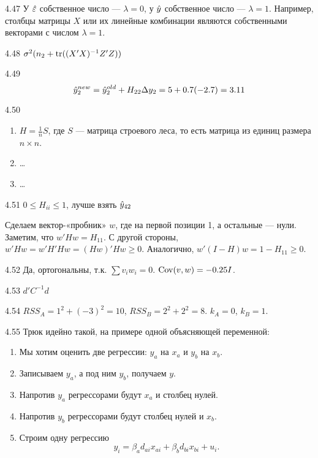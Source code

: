 \protect \hypertarget {soln:4.47}{}
\begin{solution}{{4.47}}
У $\hat{\varepsilon}$ собственное число — $\lambda=0$, у $\hat{y}$ собственное число — $\lambda=1$. Например, столбцы матрицы $X$ или их линейные комбинации являются собственными векторами с числом $\lambda=1$.
\end{solution}
\protect \hypertarget {soln:4.48}{}
\begin{solution}{{4.48}}
$\sigma^2( n_2  + \operatorname{tr}((X'X)^{-1}Z'Z))$
\end{solution}
\protect \hypertarget {soln:4.49}{}
\begin{solution}{{4.49}}
\[
\hat{y}_2^{new} = \hat{y}_2^{old} + H_{22} \Delta y_2 = 5 + 0.7(-2.7) = 3.11
\]
\end{solution}
\protect \hypertarget {soln:4.50}{}
\begin{solution}{{4.50}}
\begin{enumerate}
\item $H = \frac{1}{n} S$, где $S$ — матрица строевого леса, то есть матрица из единиц размера $n\times n$.
\item \ldots
\item \ldots
\end{enumerate}
\end{solution}
\protect \hypertarget {soln:4.51}{}
\begin{solution}{{4.51}}
$0 \leq H_{ii} \leq 1$,  лучше взять $\hat{y}_{42}$

Сделаем вектор-«пробник» $w$, где на первой позиции 1, а остальные — нули. Заметим, что $w'Hw=H_{11}$. С другой стороны, $w'Hw=w'H'Hw=(Hw)'Hw \geq 0$. Аналогично, $w'(I-H)w=1-H_{11}\geq 0$.
\end{solution}
\protect \hypertarget {soln:4.52}{}
\begin{solution}{{4.52}}
Да, ортогональны, т.к. $\sum v_i w_i = 0$. $\operatorname{Cov}(v,w)=-0.25 I$.
\end{solution}
\protect \hypertarget {soln:4.53}{}
\begin{solution}{{4.53}}
$d'C^{-1}d$
\end{solution}
\protect \hypertarget {soln:4.54}{}
\begin{solution}{{4.54}}
  $RSS_A = 1^2 + (-3)^2 = 10$, $RSS_B= 2^2 + 2^2 = 8$. $k_A = 0$, $k_B=1$.
\end{solution}
\protect \hypertarget {soln:4.55}{}
\begin{solution}{{4.55}}
Трюк идейно такой, на примере одной объясняющей переменной:

\begin{enumerate}
\item Мы хотим оценить две регрессии: $y_a$ на $x_a$ и $y_b$ на $x_b$.
\item Записываем $y_a$, а под ним $y_b$, получаем $y$.
\item Напротив $y_a$ регрессорами будут  $x_a$ и столбец нулей.
\item Напротив $y_b$ регрессорами будут столбец нулей и $x_b$.
\item Строим одну регрессию
\[
y_i = \beta_a d_{ai}x_{ai} + \beta_b d_{bi}x_{bi} + u_i.
\]
\end{enumerate}

\end{solution}
